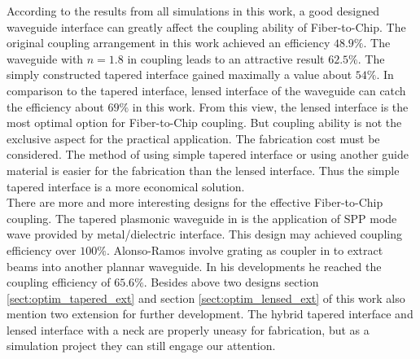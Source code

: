 According to the results from all simulations in this work, a good designed waveguide interface can greatly affect the coupling ability of Fiber-to-Chip. The original coupling arrangement in this work achieved an efficiency $48.9\%$. The waveguide with $n=1.8$ in coupling leads to an attractive result $62.5\%$. The simply constructed tapered interface gained maximally a value about $54\%$. In comparison to the tapered interface, lensed interface of the waveguide can catch the efficiency about $69\%$ in this work. From this view, the lensed interface is the most optimal option for Fiber-to-Chip coupling. But coupling ability is not the exclusive aspect for the practical application. The fabrication cost must be considered. The method of using simple tapered interface or using another guide material is easier for the fabrication than the lensed interface. Thus the simple tapered interface is a more economical solution. \\
       
There are more and more interesting designs for the effective Fiber-to-Chip coupling. The tapered plasmonic waveguide in \cite{tapered_plasmonic_waveguides} is the application of SPP mode wave provided by metal/dielectric interface. This design may achieved coupling efficiency over $100\%$. Alonso-Ramos involve grating as coupler in \cite{fiber_to_chip_grating_waveguides}  to extract beams into another plannar waveguide. In his developments he reached the coupling efficiency of $65.6\%$. Besides above two designs section \ref{sect:optim_tapered_ext} and section \ref{sect:optim_lensed_ext} of this work also mention two extension for further development. The hybrid tapered interface and lensed interface with a neck are properly uneasy for fabrication, but as a simulation project they can still engage our attention.
